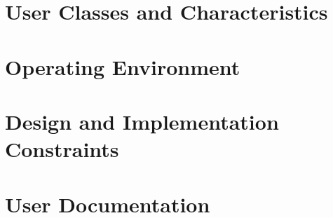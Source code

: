 \section{User Classes and Characteristics}
	\begin{comment}
		$<$Identify the various user classes that you anticipate will use this product.  
		User classes may be differentiated based on frequency of use, subset of product 
		functions used, technical expertise, security or privilege levels, educational 
		level, or experience. Describe the pertinent characteristics of each user class.  
		Certain requirements may pertain only to certain user classes. Distinguish the 
		most important user classes for this product from those who are less important 
		to satisfy.$>$
	\end{comment}

\section{Operating Environment}
	\begin{comment}
		$<$Describe the environment in which the software will operate, including the 
		hardware platform, operating system and versions, and any other software 
		components or applications with which it must peacefully coexist.$>$
	\end{comment}

\section{Design and Implementation Constraints}
	\begin{comment}
		$<$Describe any items or issues that will limit the options available to the 
		developers. These might include: corporate or regulatory policies; hardware 
		limitations (timing requirements, memory requirements); interfaces to other 
		applications; specific technologies, tools, and databases to be used; parallel 
		operations; language requirements; communications protocols; security 
		considerations; design conventions or programming standards (for example, if the 
		customer’s organization will be responsible for maintaining the delivered 
		software).$>$
	\end{comment}

\section{User Documentation}
	\begin{comment}
		$<$List the user documentation components (such as user manuals, on-line help, 
		and tutorials) that will be delivered along with the software. Identify any 
		known user documentation delivery formats or standards.$>$
	\end{comment}

